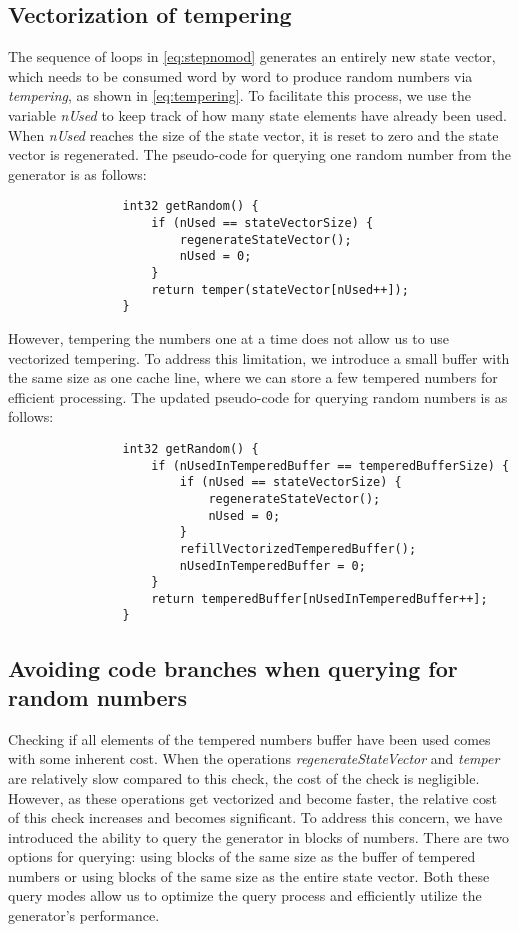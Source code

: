 \documentclass[preprint,1p,times]{elsarticle}
\begin{document}
			\subsection{Vectorization of tempering}
			The sequence of loops in \eqref{eq:stepnomod} generates an entirely new state vector, which needs to be consumed word by word to produce random numbers via \textit{tempering}, as shown in \eqref{eq:tempering}. To facilitate this process, we use the variable \textit{nUsed} to keep track of how many state elements have already been used. When \textit{nUsed} reaches the size of the state vector, it is reset to zero and the state vector is regenerated. The pseudo-code for querying one random number from the generator is as follows:
			\begin{verbatim}
				int32 getRandom() {
					if (nUsed == stateVectorSize) {
						regenerateStateVector();
						nUsed = 0;
					}
					return temper(stateVector[nUsed++]);
				}
			\end{verbatim}
			However, tempering the numbers one at a time does not allow us to use vectorized tempering. To address this limitation, we introduce a small buffer with the same size as one cache line, where we can store a few tempered numbers for efficient processing. The updated pseudo-code for querying random numbers is as follows:
			\begin{verbatim}
				int32 getRandom() {
					if (nUsedInTemperedBuffer == temperedBufferSize) {
						if (nUsed == stateVectorSize) {
							regenerateStateVector();
							nUsed = 0;
						}
						refillVectorizedTemperedBuffer();
						nUsedInTemperedBuffer = 0;
					}
					return temperedBuffer[nUsedInTemperedBuffer++];
				}
			\end{verbatim}
			\subsection{Avoiding code branches when querying for random numbers}
			\label{seq:blocks}
			Checking if all elements of the tempered numbers buffer have been used comes with some inherent cost. When the operations \textit{regenerateStateVector} and \textit{temper} are relatively slow compared to this check, the cost of the check is negligible. However, as these operations get vectorized and become faster, the relative cost of this check increases and becomes significant. To address this concern, we have introduced the ability to query the generator in blocks of numbers. There are two options for querying: using blocks of the same size as the buffer of tempered numbers or using blocks of the same size as the entire state vector. Both these query modes allow us to optimize the query process and efficiently utilize the generator's performance.
			
\end{document}
